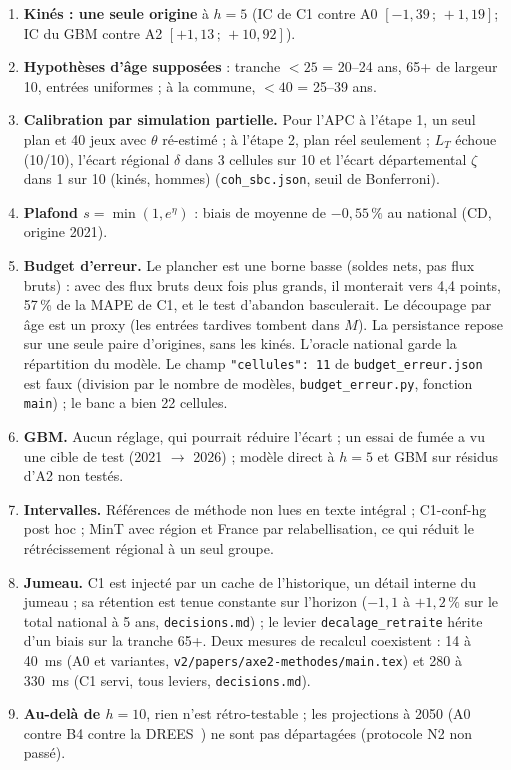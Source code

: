 \begin{enumerate}
    multipliée par 1,8\mesure{} entre 2012 et 2026. Les IDE sont mesurés au banc sur les libéraux RPPS, alors
    que la carte sert la table privée de l'axe 4, non mesurée ; série arrêtée en 2023.
  \item \textbf{Kinés : une seule origine} à $h = 5$ (IC de C1 contre A0 $[-1{,}39\,;\,+1{,}19]$\mesure ; IC
    du GBM contre A2 $[+1{,}13\,;\,+10{,}92]$\mesure).
  \item \textbf{Hypothèses d'âge supposées} : tranche $<25$ = 20--24 ans, 65+ de largeur 10, entrées
    uniformes ; à la commune, $<40$ = 25--39 ans\suppose.
  \item \textbf{Calibration par simulation partielle.} Pour l'APC à l'étape 1, un seul plan et 40 jeux avec
    $\theta$ ré-estimé ; à l'étape 2, plan réel seulement ; $L_T$ échoue (10/10\mesure), l'écart régional
    $\delta$ dans 3 cellules sur 10\mesure{} et l'écart départemental $\zeta$ dans 1 sur 10 (kinés,
    hommes)\mesure{} (\texttt{coh\_sbc.json}, seuil de Bonferroni).
  \item \textbf{Plafond $s = \min(1, e^{\eta})$} : biais de moyenne de $-0{,}55\,\%$\mesure{} au national
    (CD, origine 2021).
  \item \textbf{Budget d'erreur.} Le plancher est une borne basse (soldes nets, pas flux bruts) : avec des flux
    bruts deux fois plus grands, il monterait vers 4,4\suppose{} points, 57\,\%\derive{} de la MAPE de C1, et
    le test d'abandon basculerait. Le découpage par âge est un proxy (les entrées tardives tombent dans $M$).
    La persistance repose sur une seule paire d'origines, sans les kinés. L'oracle national garde la
    répartition du modèle. Le champ \texttt{"cellules": 11} de \texttt{budget\_erreur.json} est faux (division
    par le nombre de modèles, \texttt{budget\_erreur.py}, fonction \texttt{main}) ; le banc a bien 22 cellules.
  \item \textbf{GBM.} Aucun réglage, qui pourrait réduire l'écart ; un essai de fumée a vu une cible de test
    (2021 $\to$ 2026) ; modèle direct à $h = 5$ et GBM sur résidus d'A2 non testés.
  \item \textbf{Intervalles.} Références de méthode non lues en texte intégral ; C1-conf-hg post hoc ; MinT
    avec région et France par relabellisation, ce qui réduit le rétrécissement régional à un seul groupe.
  \item \textbf{Jumeau.} C1 est injecté par un cache de l'historique, un détail interne du jumeau ; sa
    rétention est tenue constante sur l'horizon ($-1{,}1$ à $+1{,}2\,\%$\mesure{} sur le total national à
    5 ans, \texttt{decisions.md}) ; le levier \texttt{decalage\_retraite} hérite d'un biais sur la tranche 65+.
    Deux mesures de recalcul coexistent : 14 à 40\mesure{}~ms (A0 et variantes,
    \texttt{v2/papers/axe2-methodes/main.tex}) et 280 à 330\mesure{}~ms (C1 servi, tous leviers,
    \texttt{decisions.md}).
  \item \textbf{Au-delà de $h = 10$}, rien n'est rétro-testable ; les projections à 2050 (A0 contre B4 contre
    la DREES~\cite{b-drees2021dd76}) ne sont pas départagées (protocole N2 non passé).
\end{enumerate}
